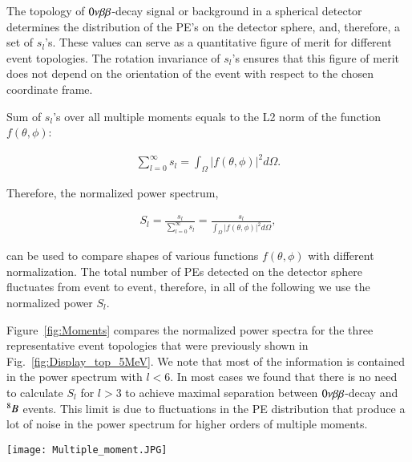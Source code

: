 The topology of $0\nu\beta\beta$-decay signal or background in a spherical detector determines the distribution of the PE's on the detector sphere, and, therefore, a set of $s_l$'s. These values can serve as a quantitative figure of merit for different event topologies. The rotation invariance of $s_l$'s ensures that this figure of merit does not depend on the orientation of the event with respect to the chosen coordinate frame.

Sum of $s_l$'s over all multiple moments equals to the L2 norm of the function $f(\theta,\phi)$:

\begin{eqnarray}
\label{eq5}
\sum_{l=0}^{\infty} s_l = \int_{\Omega} |f(\theta,\phi)|^2 d\Omega.
\end{eqnarray}

Therefore, the normalized power spectrum,

\begin{eqnarray}
\label{eq6}
S_l = \frac{s_l}{\sum_{l=0}^{\infty} s_l} =  \frac{s_l}{\int_{\Omega} |f(\theta,\phi)|^2 d\Omega},
\end{eqnarray}

can be used to compare shapes of various functions $f(\theta,\phi)$ with different normalization. The total number of PEs detected on the detector sphere fluctuates from event to event, therefore, in all of the following we use the normalized power $S_l$.

Figure~\ref{fig:Moments} compares the normalized power spectra for the three representative event topologies that were previously shown in Fig.~\ref{fig:Display_top_5MeV}. We note that most of the information is contained in the power spectrum with $l<$6. In most cases we found that there is no need to calculate $S_l$ for $l>$3 to achieve maximal separation between $0\nu\beta\beta$-decay and $^{8}B$ events. This limit is due to fluctuations in the PE distribution that produce a lot of noise in the power spectrum for higher orders of multiple moments.

\begin{figure*}[h]
  \centering
  \texttt{[image: Multiple\_moment.JPG]}
  \caption{Average $S_l$ values for two electrons at 180 degree
    (\emph{color1}) and 90 degree (\emph{color2}) 1.5~MeV each and a
    single electron (\emph{color3}) with the energy of 3~MeV. Error
    bars are RMS values of each corresponding individual $S_l$
    distribution (each consists of 1000 events simulated at the center
    of the detector) indicating typical event-by-event variation.}
\label{fig:Moments}
\end{figure*}


